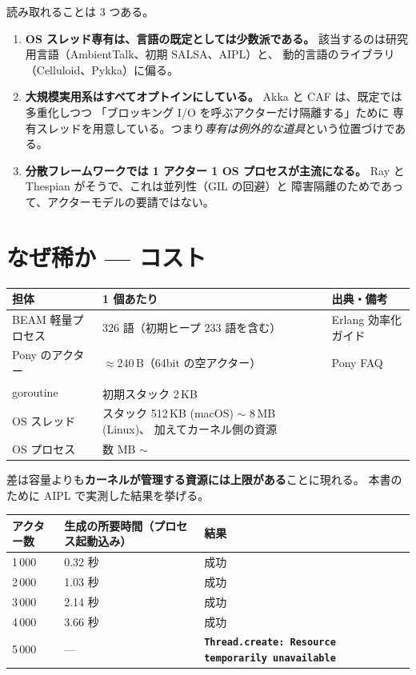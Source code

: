 \documentclass[11pt,a4paper]{ltjsarticle}
\newcommand{\dg}{\textsuperscript{\dag}}
\begin{document}
読み取れることは 3 つある。

\begin{enumerate}
\item \textbf{OS スレッド専有は、言語の既定としては少数派である。}
  該当するのは研究用言語（AmbientTalk、初期 SALSA、AIPL）と、
  動的言語のライブラリ（Celluloid、Pykka）に偏る。
\item \textbf{大規模実用系はすべてオプトインにしている。}
  Akka と CAF は、既定では多重化しつつ
  「ブロッキング I/O を呼ぶアクターだけ隔離する」ために
  専有スレッドを用意している。つまり\emph{専有は例外的な道具}という位置づけである。
\item \textbf{分散フレームワークでは 1 アクター 1 OS プロセスが主流になる。}
  Ray と Thespian がそうで、これは並列性（GIL の回避）と
  障害隔離のためであって、アクターモデルの要請ではない。
\end{enumerate}

\section{なぜ稀か --- コスト}
\label{sec:cost}

\begin{center}
\small
\begin{tabular}{@{}lp{6.2cm}l@{}}
\toprule
担体 & 1 個あたり & 出典・備考 \\
\midrule
BEAM 軽量プロセス & 326 語（初期ヒープ 233 語を含む）
  & Erlang 効率化ガイド \\
Pony のアクター & $\approx$240\,B（64bit の空アクター）
  & Pony FAQ \\
goroutine & 初期スタック 2\,KB\dg & \\
OS スレッド & スタック 512\,KB (macOS) $\sim$ 8\,MB (Linux)、
              加えてカーネル側の資源 & \\
OS プロセス & 数 MB $\sim$ & \\
\bottomrule
\end{tabular}
\end{center}

差は容量よりも\textbf{カーネルが管理する資源には上限がある}ことに現れる。
本書のために AIPL で実測した結果を挙げる。

\begin{center}
\small
\begin{tabular}{@{}lll@{}}
\toprule
アクター数 & 生成の所要時間（プロセス起動込み） & 結果 \\
\midrule
1\,000  & 0.32 秒 & 成功 \\
2\,000  & 1.03 秒 & 成功 \\
3\,000  & 2.14 秒 & 成功 \\
4\,000  & 3.66 秒 & 成功 \\
5\,000  & --- & \textbf{\texttt{Thread.create: Resource temporarily unavailable}} \\
\bottomrule
\end{tabular}
\end{center}
\end{document}
